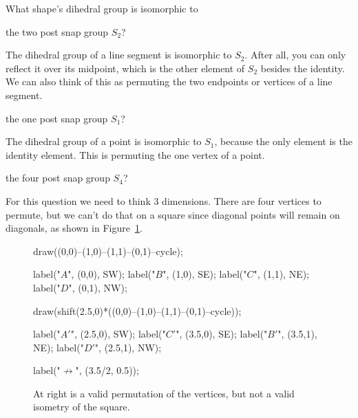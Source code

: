 \documentclass[../key.tex]{subfiles}
\begin{document}
\begin{outer_problem}
\item What shape's dihedral group is isomorphic to
\end{outer_problem}

\begin{inner_problem}[start=1]
\item the two post snap group $S_2$?
\end{inner_problem}

\noindent The dihedral group of a line segment is isomorphic to $S_2$. After all, you can only reflect it over its midpoint, which is the other element of $S_2$ besides the identity. We can also think of this as permuting the two endpoints or vertices of a line segment.

\begin{inner_problem}
\item the one post snap group $S_1$?
\end{inner_problem}

\noindent The dihedral group of a point is isomorphic to $S_1$, because the only element is the identity element. This is permuting the one vertex of a point.

\begin{inner_problem}
\item the four post snap group $S_4$?
\end{inner_problem}

\noindent For this question we need to think $3$ dimensions. There are four vertices to permute, but we can't do that on a square since diagonal points will remain on diagonals, as shown in Figure~\ref{fig:impossiblus_square}.

\begin{figure}[h]
	\begin{center}
		\begin{minipage}[b]{\textwidth}
			\centering
			\begin{asy}[width=0.5\textwidth]
			draw((0,0)--(1,0)--(1,1)--(0,1)--cycle);
			
			label("$A$", (0,0), SW);
			label("$B$", (1,0), SE);
			label("$C$", (1,1), NE);
			label("$D$", (0,1), NW);
			
			draw(shift(2.5,0)*((0,0)--(1,0)--(1,1)--(0,1)--cycle));
			
			label("$A'$", (2.5,0), SW);
			label("$C'$", (3.5,0), SE);
			label("$B'$", (3.5,1), NE);
			label("$D'$", (2.5,1), NW);
			
			label("$\not\longrightarrow$", (3.5/2, 0.5));
			\end{asy}
		\end{minipage}
	\end{center}
	\vspace*{-2\baselineskip}
	\begin{center}
		\begin{minipage}[t]{\textwidth}
			\caption{At right is a valid permutation of the vertices, but not a valid isometry of the square.}
			\label{fig:impossiblus_square}
		\end{minipage}
	\end{center}
	\vspace*{-2\baselineskip}
\end{figure}
\end{document}
